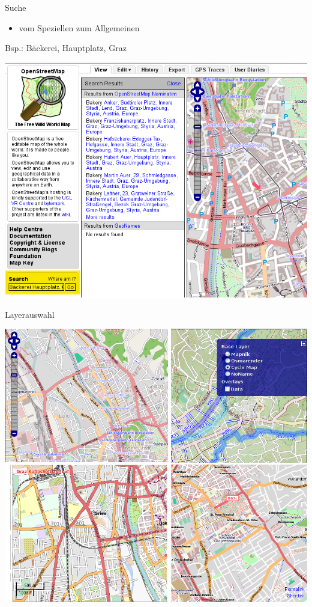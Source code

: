 \documentclass{beamer}
\begin{document}
\begin{frame}{Suche}

  \begin{itemize}
    \item vom Speziellen zum Allgemeinen
  \end{itemize}
Bsp.: Bäckerei, Hauptplatz, Graz

\begin{center}
\includegraphics[width=.55\paperwidth]{nominatim.png}
\end{center}

\end{frame}

\begin{frame}{Layerauswahl}
\begin{center}
\includegraphics[width=.6\paperwidth]{4layers.png}
\end{center}
\end{frame}
\end{document}
